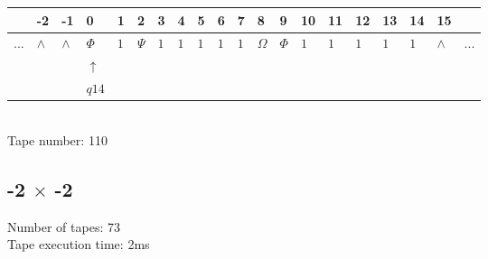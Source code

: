 \documentclass[11pt]{article}
\begin{document}
\begin{table}[H]
\centering
\begin{tabular}{llllllllllllllllllll}
 & -2 & -1 & 0 & 1 & 2 & 3 & 4 & 5 & 6 & 7 & 8 & 9 & 10 & 11 & 12 & 13 & 14 & 15 & \\
\hline
$...$ & \multicolumn{1}{|l|}{$\wedge$} & \multicolumn{1}{|l|}{$\wedge$} & \multicolumn{1}{|l|}{$\Phi$} & \multicolumn{1}{|l|}{$1$} & \multicolumn{1}{|l|}{$\Psi$} & \multicolumn{1}{|l|}{$1$} & \multicolumn{1}{|l|}{$1$} & \multicolumn{1}{|l|}{$1$} & \multicolumn{1}{|l|}{$1$} & \multicolumn{1}{|l|}{$1$} & \multicolumn{1}{|l|}{$\Omega$} & \multicolumn{1}{|l|}{$\Phi$} & \multicolumn{1}{|l|}{$1$} & \multicolumn{1}{|l|}{$1$} & \multicolumn{1}{|l|}{$1$} & \multicolumn{1}{|l|}{$1$} & \multicolumn{1}{|l|}{$1$} & \multicolumn{1}{|l|}{$\wedge$} & $...$\\
\hline
&  &  & $\uparrow$ &  &  &  &  &  &  &  &  &  &  &  &  &  &  &  &  \\
&  &  & $ q14 $ &  &  &  &  &  &  &  &  &  &  &  &  &  &  &  &  \\
\end{tabular}
\\
Tape number: 110
\noindent\makebox[\linewidth]{\hdashrule{\textwidth}{1pt}{1pt}}\end{table}
\clearpage





























\subsection{-2 $\times$ -2}
Number of tapes: 73\\
Tape execution time: 2ms\\
\end{document}
